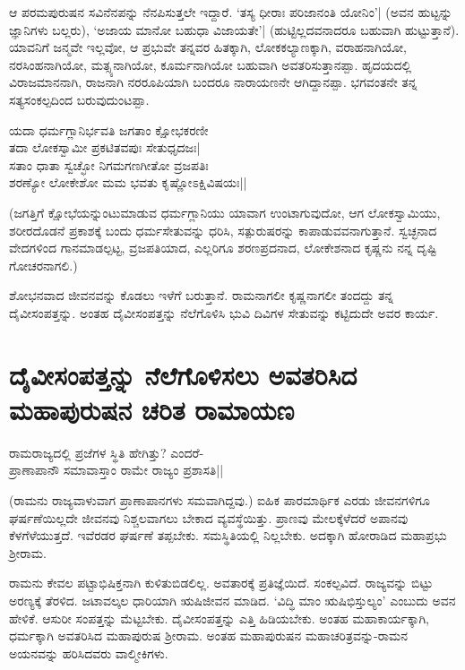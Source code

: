 ಆ ಪರಮಪುರುಷನ ಸವಿನೆನಪನ್ನು ನೆನಪಿಸುತ್ತಲೇ ಇದ್ದಾರೆ. `ತಸ್ಯ ಧೀರಾಃ ಪರಿಜಾನಂತಿ ಯೋನಿಂ'| (ಅವನ ಹುಟ್ಟನ್ನು ಜ್ಞಾನಿಗಳು ಬಲ್ಲರು), `ಅಜಾಯ ಮಾನೋ ಬಹುಧಾ ವಿಜಾಯತೇ'|\label{150} (ಹುಟ್ಟಿಲ್ಲದವನಾದರೂ ಬಹುವಾಗಿ ಹುಟ್ಟುತ್ತಾನೆ). ಯಾವನಿಗೆ ಜನ್ಮವೇ ಇಲ್ಲವೋ, ಆ ಪ್ರಭುವೇ ತನ್ನವರ ಹಿತಕ್ಕಾಗಿ, ಲೋಕಕಲ್ಯಾಣಕ್ಕಾಗಿ, ವರಾಹನಾಗಿಯೋ, ನರಸಿಂಹನಾಗಿಯೋ, ಮತ್ಸ್ಯನಾಗಿಯೋ, ಕೂರ್ಮನಾಗಿಯೋ ಬಹುವಾಗಿ ಅವತರಿಸುತ್ತಾನಪ್ಪಾ. ಹೃದಯದಲ್ಲಿ ವಿರಾಜಮಾನನಾಗಿ, ರಾಜನಾಗಿ ನರರೂಪಿಯಾಗಿ ಬಂದರೂ ನಾರಾಯಣನೇ ಆಗಿದ್ದಾನಪ್ಪಾ. ಭಗವಂತನೇ ತನ್ನ ಸತ್ಯಸಂಕಲ್ಪದಿಂದ ಬರುವುದುಂಟಪ್ಪಾ. 

\begin{shloka} 
ಯದಾ ಧರ್ಮಗ್ಲಾನಿರ್ಭವತಿ ಜಗತಾಂ ಕ್ಷೋಭಕರಣೀ\\ 
ತದಾ ಲೋಕಸ್ವಾಮೀ ಪ್ರಕಟಿತವಪುಃ ಸೇತುಧೃದಜಃ|\\ 
ಸತಾಂ ಧಾತಾ ಸ್ವಚ್ಛೋ ನಿಗಮಗಣಗೀತೋ ವ್ರಜಪತಿಃ\\ 
ಶರಣ್ಯೋ ಲೋಕೇಶೋ ಮಮ ಭವತು ಕೃಷ್ಣೋಽಕ್ಷಿವಿಷಯಃ||
\end{shloka} 

(ಜಗತ್ತಿಗೆ ಕ್ಷೋಭೆಯನ್ನುಂಟುಮಾಡುವ ಧರ್ಮಗ್ಲಾನಿಯು ಯಾವಾಗ ಉಂಟಾಗುವುದೋ, ಆಗ ಲೋಕಸ್ವಾಮಿಯು, ಶರೀರದೊಡನೆ ಪ್ರಕಾಶಕ್ಕೆ ಬಂದು ಧರ್ಮಸೇತುವನ್ನು ಧರಿಸಿ, ಸತ್ಪುರುಷರನ್ನು ಕಾಪಾಡುವವನಾಗುತ್ತಾನೆ. ಸ್ವಚ್ಛನಾದ ವೇದಗಳಿಂದ ಗಾನಮಾಡಲ್ಪಟ್ಟ, ವ್ರಜಪತಿಯಾದ, ಎಲ್ಲರಿಗೂ ಶರಣಪ್ರದನಾದ, ಲೋಕೇಶನಾದ ಕೃಷ್ಣನು ನನ್ನ ದೃಷ್ಟಿ ಗೋಚರನಾಗಲಿ.) 

ಶೋಭನವಾದ ಜೀವನವನ್ನು ಕೊಡಲು ಇಳೆಗೆ ಬರುತ್ತಾನೆ. ರಾಮನಾಗಲೀ ಕೃಷ್ಣನಾಗಲೀ ತಂದದ್ದು ತನ್ನ ದೈವೀಸಂಪತ್ತನ್ನು. ಅಂತಹ ದೈವೀಸಂಪತ್ತನ್ನು ನೆಲೆಗೊಳಿಸಿ ಭುವಿ ದಿವಿಗಳ ಸೇತುವನ್ನು ಕಟ್ಟಿದುದೇ ಅವರ ಕಾರ್ಯ. 

\section*{ದೈವೀಸಂಪತ್ತನ್ನು ನೆಲೆಗೊಳಿಸಲು ಅವತರಿಸಿದ ಮಹಾಪುರುಷನ ಚರಿತ ರಾಮಾಯಣ} 

\begin{shloka} 
ರಾಮರಾಜ್ಯದಲ್ಲಿ ಪ್ರಜೆಗಳ ಸ್ಥಿತಿ ಹೇಗಿತ್ತು? ಎಂದರೆ-\\ 
ಪ್ರಾಣಾಪಾನೌ ಸಮಾವಾಸ್ತಾಂ ರಾಮೇ ರಾಜ್ಯಂ ಪ್ರಶಾಸತಿ||
\end{shloka} 

(ರಾಮನು ರಾಜ್ಯವಾಳುವಾಗ ಪ್ರಾಣಾಪಾನಗಳು ಸಮವಾಗಿದ್ದವು.) ಐಹಿಕ ಪಾರಮಾರ್ಥಿಕ ಎರಡು ಜೀವನಗಳಿಗೂ ಘರ್ಷಣೆಯಿಲ್ಲದೇ ಜೀವನವು ನಿಶ್ಚಲವಾಗಲು ಬೇಕಾದ ವ್ಯವಸ್ಥೆಯಿತ್ತು. ಪ್ರಾಣವು ಮೇಲಕ್ಕೆಳೆದರೆ ಅಪಾನವು ಕೆಳಗೆಳೆಯುತ್ತದೆ. ಇವೆರಡರ ಘರ್ಷಣೆ ತಪ್ಪಬೇಕು. ಸಮಸ್ಥಿತಿಯಲ್ಲಿ ನಿಲ್ಲಬೇಕು. ಅದಕ್ಕಾಗಿ ಹೋರಾಡಿದ ಮಹಾಪ್ರಭು ಶ್ರೀರಾಮ. 

ರಾಮನು ಕೇವಲ ಪಟ್ಟಾಭಿಷಿಕ್ತನಾಗಿ ಕುಳಿತುಬಿಡಲಿಲ್ಲ. ಅವತಾರಕ್ಕೆ ಪ್ರತಿಜ್ಞೆಯಿದೆ. ಸಂಕಲ್ಪವಿದೆ. ರಾಜ್ಯವನ್ನು ಬಿಟ್ಟು ಅರಣ್ಯಕ್ಕೆ ತೆರಳಿದ. ಜಟಾವಲ್ಕಲ ಧಾರಿಯಾಗಿ ಋಷಿಜೀವನ ಮಾಡಿದ. `ವಿದ್ಧಿ ಮಾಂ ಋಷಿಭಿಸ್ತುಲ್ಯಂ' ಎಂಬುದು ಅವನ ಹೇಳಿಕೆ. ಆಸುರೀ ಸಂಪತ್ತನ್ನು ಮೆಟ್ಟಬೇಕು. ದೈವೀಸಂಪತ್ತನ್ನು ಎತ್ತಿ ಹಿಡಿಯಬೇಕು. ಅಂತಹ ಮಹಾಕಾರ್ಯಕ್ಕಾಗಿ, ಧರ್ಮಕ್ಕಾಗಿ ಅವತರಿಸಿದ ಮಹಾಪುರುಷ ಶ್ರೀರಾಮ. ಅಂತಹ ಮಹಾಪುರುಷನ ಮಹಾಚರಿತ್ರವನ್ನು-ರಾಮನ ಅಯನವನ್ನು ಹರಿಸಿದವರು ವಾಲ್ಮೀಕಿಗಳು. 


